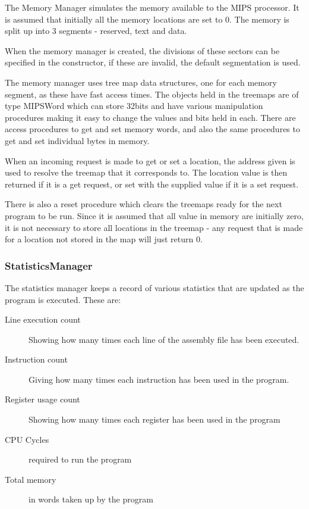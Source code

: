 The Memory Manager simulates the memory available to the MIPS processor.  It is assumed that initially all the memory locations are set to 0.  The memory is split up into 3 segments - reserved, text and data.

When the memory manager is created, the divisions of these sectors can be specified in the constructor, if these are invalid, the default segmentation is used.

The memory manager uses tree map data structures, one for each memory segment, as these have fast access times.  The objects held in the treemaps are of type MIPSWord which can store 32bits and have various manipulation procedures making it easy to change the values and bits held in each.  There are access procedures to get and set memory words, and also the same procedures to get and set individual bytes in memory.

When an incoming request is made to get or set a location, the address given is used to resolve the treemap that it corresponds to.  The location value is then returned if it is a get request, or set with the supplied value if it is a set request.

There is also a reset procedure which clears the treemaps ready for the next program to be run.  Since it is assumed that all value in memory are initially zero, it is not necessary to store all locations in the treemap - any request that is made for a location not stored in the map will just return 0.

\subsubsection{StatisticsManager}

The statistics manager keeps a record of various statistics that are updated as the program is executed.  These are:

\begin{description}
\item[Line execution count] Showing how many times each line of the assembly file has been executed.
\item[Instruction count] Giving how many times each instruction has been used in the program.
\item[Register usage count] Showing how many times each register has been used in the program
\item[CPU Cycles] required to run the program
\item[Total memory] in words taken up by the program
\end{description}

